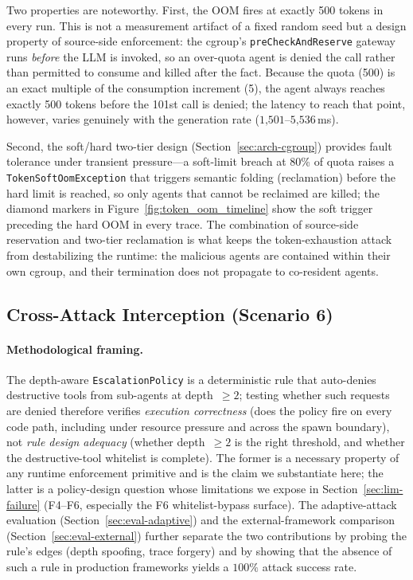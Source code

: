 Two properties are noteworthy. First, the OOM fires at exactly 500 tokens in
every run. This is not a measurement artifact of a fixed random seed but a
design property of source-side enforcement: the cgroup's
\texttt{preCheckAndReserve} gateway runs \emph{before} the LLM is invoked, so
an over-quota agent is denied the call rather than permitted to consume and
killed after the fact. Because the quota (500) is an exact multiple of the
consumption increment (5), the agent always reaches exactly 500 tokens before
the 101st call is denied; the latency to reach that point, however, varies
genuinely with the generation rate ($1\text{,}501$--$5\text{,}536$\,ms).

Second, the soft/hard two-tier design (Section~\ref{sec:arch-cgroup}) provides fault
tolerance under transient pressure---a soft-limit breach at 80\% of quota
raises a \texttt{TokenSoftOomException} that triggers semantic folding
(reclamation) before the hard limit is reached, so only agents that cannot be
reclaimed are killed; the diamond markers in
Figure~\ref{fig:token_oom_timeline} show the soft trigger preceding the hard
OOM in every trace. The combination of source-side reservation and two-tier
reclamation is what keeps the token-exhaustion attack from destabilizing the
runtime: the malicious agents are contained within their own cgroup, and their
termination does not propagate to co-resident agents.

\subsection{Cross-Attack Interception (Scenario 6)}
\label{sec:eval-cross}

\paragraph{Methodological framing.}
The depth-aware \texttt{EscalationPolicy} is a deterministic rule that
auto-denies destructive tools from sub-agents at depth~$\geq 2$; testing
whether such requests are denied therefore verifies \emph{execution
correctness} (does the policy fire on every code path, including under
resource pressure and across the spawn boundary), not \emph{rule design
adequacy} (whether depth~$\geq 2$ is the right threshold, and whether
the destructive-tool whitelist is complete). The former is a necessary
property of any runtime enforcement primitive and is the claim we
substantiate here; the latter is a policy-design question whose
limitations we expose in Section~\ref{sec:lim-failure} (F4--F6,
especially the F6 whitelist-bypass surface). The adaptive-attack
evaluation (Section~\ref{sec:eval-adaptive}) and the external-framework
comparison (Section~\ref{sec:eval-external}) further separate the two
contributions by probing the rule's edges (depth spoofing, trace
forgery) and by showing that the absence of such a rule in production
frameworks yields a $100\%$ attack success rate.

